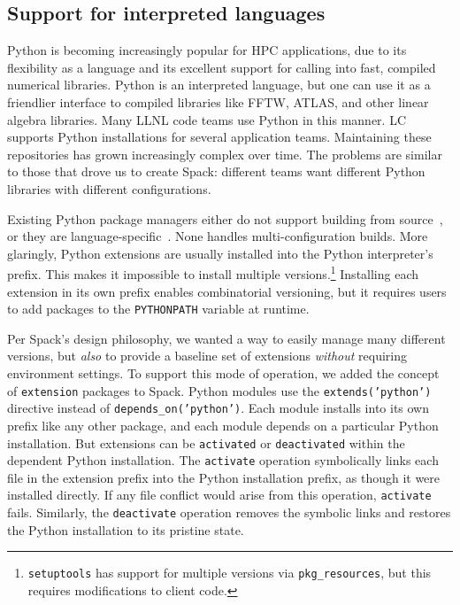 
\subsection{Support for interpreted languages}
\label{sec:usecase-python}

Python is becoming increasingly popular for HPC applications,
due to its flexibility as a language and its excellent support
for calling into fast, compiled numerical libraries.
Python is an interpreted language, but one can use it
as a friendlier interface to compiled libraries like FFTW, ATLAS, and
other linear algebra libraries.  Many LLNL code teams use Python in this manner.
%
LC supports Python installations for several application teams.
Maintaining these repositories has grown increasingly complex over
time. The problems are similar to those that drove us to create
Spack: different teams want different Python libraries with different
configurations.

Existing Python package managers either do not support building from
source~\cite{anaconda,conda}, or they are language-specific~\cite{eby:setuptools}.
None handles multi-configuration builds.  More glaringly, Python extensions
are usually installed into the Python interpreter's prefix.
This makes it impossible to install multiple versions.\footnote{{\tt setuptools}
has support for multiple versions via {\tt pkg_resources},
but this requires modifications to client code.}
Installing each extension in its own prefix enables combinatorial versioning,
but it requires users to add packages to the {\tt PYTHONPATH} variable at runtime.

Per Spack's design philosophy, we wanted a way to easily manage many different
versions, but {\it also} to provide a baseline set of extensions {\it without}
requiring environment settings.
%
To support this mode of operation, we added the concept of {\tt extension} packages
to Spack. Python modules use the {\tt extends('python')} directive instead of
{\tt depends\_on('python')}.
Each module installs into its own prefix like any other package,
and each module depends on a particular Python installation.
But extensions can be {\tt activated} or {\tt deactivated}
within the dependent Python installation.  The {\tt activate} operation
symbolically links each file in the extension prefix into the Python
installation prefix, as though it were installed directly. If any file
conflict would arise from this operation, {\tt activate} fails.
Similarly, the {\tt deactivate} operation removes the symbolic links and restores
the Python installation to its  pristine state.

